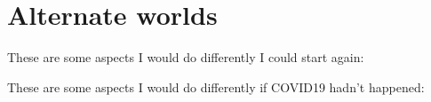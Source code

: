 \chapter{Alternate worlds}

These are some aspects I would do differently I could start again:

These are some aspects I would do differently if COVID19 hadn't happened:
